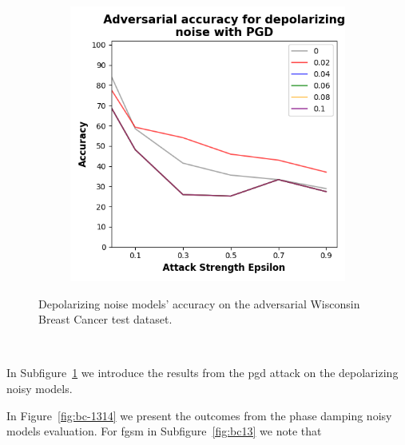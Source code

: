 \begin{figure}[!h]
\begin{subfigure}{0.45\textwidth}
      \includegraphics[width=\linewidth]{figures/evaluation_results/breast-cancer/pqc/figures/depolarizing-pgd.png}
      \label{fig:bc12}
  \end{subfigure}
  \caption{Depolarizing noise models' accuracy on the adversarial Wisconsin Breast Cancer test dataset.}
  \label{fig:bc-1112}
\end{figure} \

In Subfigure~\ref{fig:bc12} we introduce the results from the \ac{pgd}
attack on the depolarizing noisy models. \

In Figure~\ref{fig:bc-1314} we present the outcomes from the phase damping
noisy models evaluation. For \ac{fgsm} in Subfigure~\ref{fig:bc13}
we note that \

